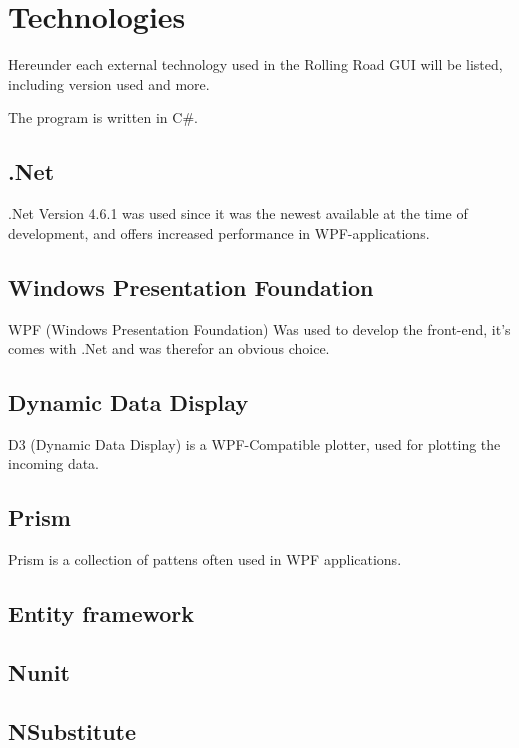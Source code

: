 \chapter{Technologies}


Hereunder each external technology used in the Rolling Road GUI will be listed, including version used and more.  

The program is written in C\#.

\section{.Net}

.Net Version 4.6.1 was used since it was the newest available at the time of development, and offers increased performance in WPF-applications. 

\section{Windows Presentation Foundation}

WPF (Windows Presentation Foundation) Was used to develop the front-end, it's comes with .Net and was therefor an obvious choice.

\section{Dynamic Data Display}

D3 (Dynamic Data Display) is a WPF-Compatible plotter, used for plotting the incoming data. 

\section{Prism}

Prism is a collection of pattens often used in WPF applications.

\section{Entity framework}

\section{Nunit}

\section{NSubstitute}